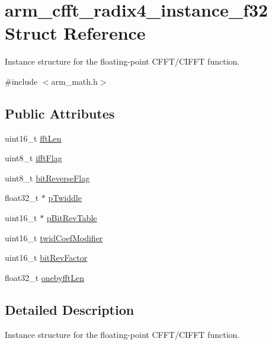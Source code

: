 \hypertarget{structarm__cfft__radix4__instance__f32}{}\section{arm\+\_\+cfft\+\_\+radix4\+\_\+instance\+\_\+f32 Struct Reference}
\label{structarm__cfft__radix4__instance__f32}


Instance structure for the floating-\/point C\+F\+F\+T/\+C\+I\+F\+FT function.  




{\ttfamily \#include $<$arm\+\_\+math.\+h$>$}

\subsection*{Public Attributes}
\begin{DoxyCompactItemize}
\item 
uint16\+\_\+t \hyperlink{structarm__cfft__radix4__instance__f32_a7e6a6d290ce158ce9a15a45e364b021a}{fft\+Len}
\item 
uint8\+\_\+t \hyperlink{structarm__cfft__radix4__instance__f32_a25d1da64dd6487c291f04d226f9acc66}{ifft\+Flag}
\item 
uint8\+\_\+t \hyperlink{structarm__cfft__radix4__instance__f32_ac10927a1620195a88649ce63dab66120}{bit\+Reverse\+Flag}
\item 
float32\+\_\+t $\ast$ \hyperlink{structarm__cfft__radix4__instance__f32_a14860c7544911702ca1fa0bf78204ef3}{p\+Twiddle}
\item 
uint16\+\_\+t $\ast$ \hyperlink{structarm__cfft__radix4__instance__f32_a8da0d2ca69749fde8cbb95caeac6fe6a}{p\+Bit\+Rev\+Table}
\item 
uint16\+\_\+t \hyperlink{structarm__cfft__radix4__instance__f32_abe31ea2157dfa233e389cdfd3b9993ee}{twid\+Coef\+Modifier}
\item 
uint16\+\_\+t \hyperlink{structarm__cfft__radix4__instance__f32_acc8cb18a8b901b8321ab9d86491e41a3}{bit\+Rev\+Factor}
\item 
float32\+\_\+t \hyperlink{structarm__cfft__radix4__instance__f32_ab9eed39e40b8d7c16381fbccf84467cd}{onebyfft\+Len}
\end{DoxyCompactItemize}


\subsection{Detailed Description}
Instance structure for the floating-\/point C\+F\+F\+T/\+C\+I\+F\+FT function. 

